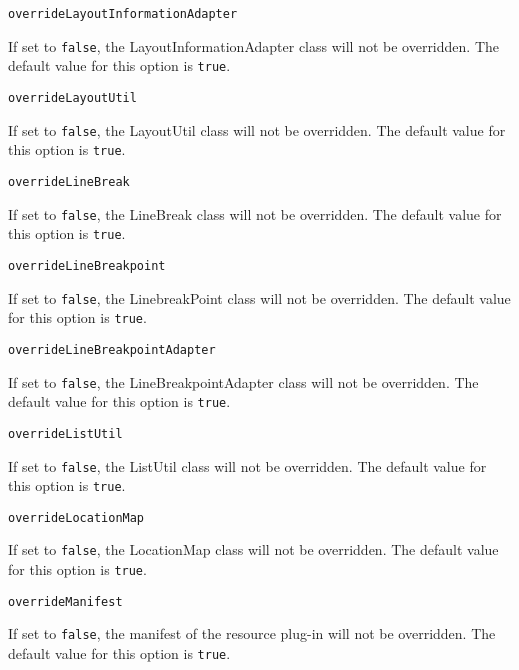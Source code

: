 \noindent\texttt{overrideLayoutInformationAdapter}
\begin{myindentpar}{1cm}
If set to \texttt{false}, the LayoutInformationAdapter class will not be overridden. The default value for this option is \texttt{true}.
\end{myindentpar}

\noindent\texttt{overrideLayoutUtil}
\begin{myindentpar}{1cm}
If set to \texttt{false}, the LayoutUtil class will not be overridden. The default value for this option is \texttt{true}.
\end{myindentpar}

\noindent\texttt{overrideLineBreak}
\begin{myindentpar}{1cm}
If set to \texttt{false}, the LineBreak class will not be overridden. The default value for this option is \texttt{true}.
\end{myindentpar}

\noindent\texttt{overrideLineBreakpoint}
\begin{myindentpar}{1cm}
If set to \texttt{false}, the LinebreakPoint class will not be overridden. The default value for this option is \texttt{true}.
\end{myindentpar}

\noindent\texttt{overrideLineBreakpointAdapter}
\begin{myindentpar}{1cm}
If set to \texttt{false}, the LineBreakpointAdapter class will not be overridden. The default value for this option is \texttt{true}.
\end{myindentpar}

\noindent\texttt{overrideListUtil}
\begin{myindentpar}{1cm}
If set to \texttt{false}, the ListUtil class will not be overridden. The default value for this option is \texttt{true}.
\end{myindentpar}

\noindent\texttt{overrideLocationMap}
\begin{myindentpar}{1cm}
If set to \texttt{false}, the LocationMap class will not be overridden. The default value for this option is \texttt{true}.
\end{myindentpar}

\noindent\texttt{overrideManifest}
\begin{myindentpar}{1cm}
If set to \texttt{false}, the manifest of the resource plug-in will not be overridden. The default value for this option is \texttt{true}.
\end{myindentpar}

